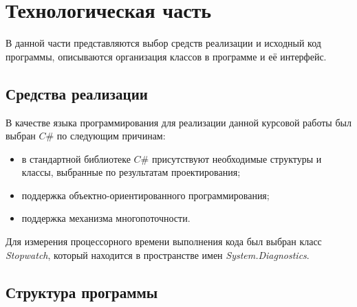 \chapter{Технологическая часть}

В данной части представляются выбор средств реализации и исходный код программы, описываются организация классов в программе и её интерфейс.

\section{Средства реализации}

В качестве языка программирования для реализации данной курсовой работы был выбран $C\#$ по следующим причинам:
\begin{itemize}[label=--]
	\item в стандартной библиотеке $C\#$ присутствуют необходимые структуры и классы, выбранные по результатам проектирования;
	\item поддержка объектно-ориентированного программирования;
	\item поддержка механизма многопоточности.
\end{itemize}

Для измерения процессорного времени выполнения кода был выбран класс \textit{Stopwatch}, который находится в пространстве имен \textit{System.Diagnostics}.

\section{Структура программы}

